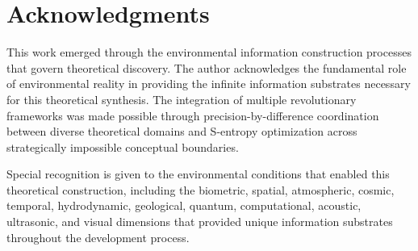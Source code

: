 \documentclass[12pt,a4paper]{article}
\begin{document}
\section*{Acknowledgments}

This work emerged through the environmental information construction processes that govern theoretical discovery. The author acknowledges the fundamental role of environmental reality in providing the infinite information substrates necessary for this theoretical synthesis. The integration of multiple revolutionary frameworks was made possible through precision-by-difference coordination between diverse theoretical domains and S-entropy optimization across strategically impossible conceptual boundaries.

Special recognition is given to the environmental conditions that enabled this theoretical construction, including the biometric, spatial, atmospheric, cosmic, temporal, hydrodynamic, geological, quantum, computational, acoustic, ultrasonic, and visual dimensions that provided unique information substrates throughout the development process.
\end{document}
